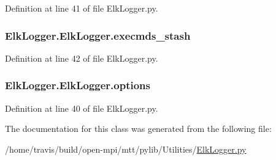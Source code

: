 Definition at line 41 of file Elk\-Logger.\-py.

\hypertarget{class_elk_logger_1_1_elk_logger_a65f00c7ccade5b7318512ef6e1a46812}{
\subsubsection[{execmds\-\_\-stash}]{\setlength{\rightskip}{0pt plus 5cm}Elk\-Logger.\-Elk\-Logger.\-execmds\-\_\-stash}}\label{class_elk_logger_1_1_elk_logger_a65f00c7ccade5b7318512ef6e1a46812}


Definition at line 42 of file Elk\-Logger.\-py.

\hypertarget{class_elk_logger_1_1_elk_logger_afb3317fb9852e155eafb35a70c3dc7e8}{
\subsubsection[{options}]{\setlength{\rightskip}{0pt plus 5cm}Elk\-Logger.\-Elk\-Logger.\-options}}\label{class_elk_logger_1_1_elk_logger_afb3317fb9852e155eafb35a70c3dc7e8}


Definition at line 40 of file Elk\-Logger.\-py.



The documentation for this class was generated from the following file\-:\begin{DoxyCompactItemize}
\item 
/home/travis/build/open-\/mpi/mtt/pylib/\-Utilities/\hyperlink{_elk_logger_8py}{Elk\-Logger.\-py}\end{DoxyCompactItemize}
